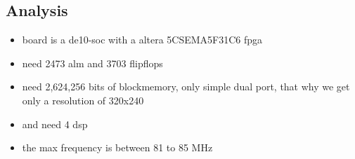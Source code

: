\subsection{Analysis}
\begin{itemize}
	\item board is a de10-soc with a altera 5CSEMA5F31C6 fpga
	\item need 2473 alm and 3703 flipflops
	\item need 2,624,256 bits of blockmemory, only simple dual port, that why we get only a resolution of 320x240
	\item and need 4 dsp
	\item the max frequency is between 81 to 85 MHz
\end{itemize}